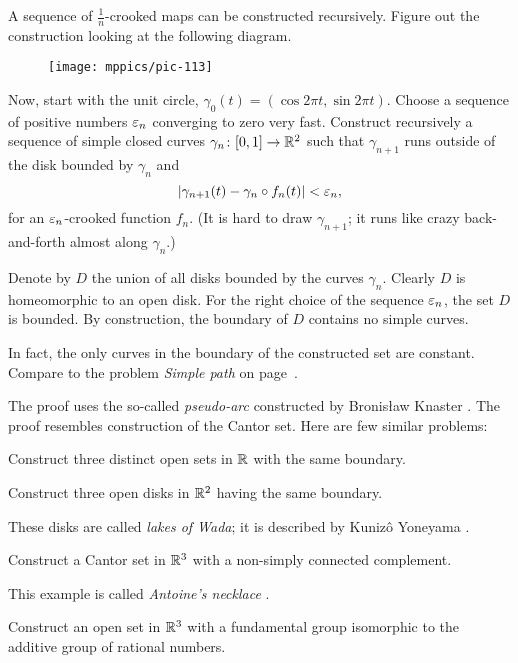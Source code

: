 A sequence of $\tfrac1n$-crooked maps can be constructed recursively. 
Figure out the construction looking at the following diagram.

\begin{figure}[ht!]
\centering
\texttt{[image: mppics/pic-113]}
\end{figure}

Now, start with the unit circle, 
$\gamma_0(t)=(\cos 2\pi t,\sin 2 \pi t)$.
Choose a sequence of positive numbers $\varepsilon_n$ converging to zero very fast. 
Construct recursively a sequence of simple closed curves $\gamma_n\:[0,1]\z\to\RR^2$ such that $\gamma_{n+1}$ runs outside of the disk bounded by $\gamma_n$
and 
\[|\gamma_{n+1}(t)-\gamma_n\circ f_n(t)|<\varepsilon_n,\]
for an $\varepsilon_n$-crooked function $f_n$.
(It is hard to draw $\gamma_{n+1}$; it runs like crazy back-and-forth almost along $\gamma_n$.)

Denote by $D$ the union of all disks bounded by the curves $\gamma_n$.
Clearly $D$ is homeomorphic to an open disk.
For the right choice of the sequence $\varepsilon_n$, 
the set $D$ is bounded.
By construction, the boundary of $D$ contains no simple curves. \qeds

In fact, the only curves in the boundary of the constructed set are constant. Compare to the problem \emph{Simple path} on page~\pageref{Simple path}.

The proof uses the so-called \emph{pseudo-arc} 
constructed by Bronis\l{}aw Knaster \cite{knaster}.
The proof resembles construction of the Cantor set.
Here are few similar problems:


\begin{pr}
 Construct three distinct open sets in $\mathbb{R}$ with the same boundary.
\end{pr}

\begin{pr}
 Construct three open disks in $\mathbb{R}^2$ having the same boundary.
\end{pr}

These disks are called \emph{lakes of Wada}; it is described by Kuniz\^{o} Yo\-ne\-ya\-ma \cite{yoneyama}.

\begin{pr}
 Construct a Cantor set in $\mathbb{R}^3$ with a non-simply connected complement.
\end{pr}

This example is called \emph{Antoine's necklace} \cite{antoine}.

\begin{pr}
 Construct an open set in $\mathbb{R}^3$ with a fundamental group isomorphic to the additive group of rational numbers.
\end{pr}

